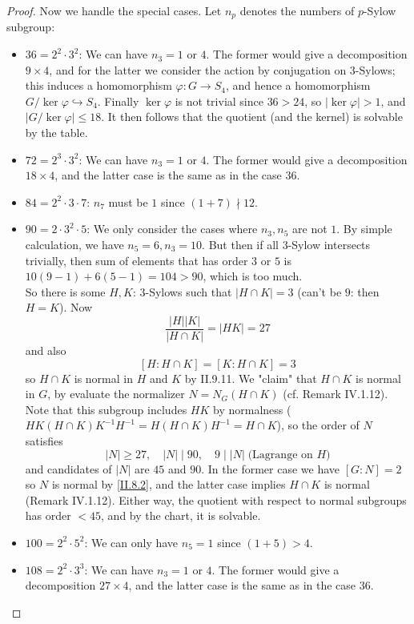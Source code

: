 \begin{proof}
Now we handle the special cases. Let $n_p$ denotes the numbers of $p$-Sylow subgroup:
\begin{itemize}
\setlength\itemsep{0pt}
\item $36 = 2^2 \cdot 3^2$: We can have $n_3 = 1$ or $4$. The former would give a decomposition $9 \times 4$, and for the latter we consider the action by conjugation on $3$-Sylows; this induces a homomorphism $\varphi : G \to S_4$, and hence a homomorphism $G/\ker \varphi \hookrightarrow S_4$. Finally $\ker \varphi$ is not trivial since $36 > 24$, so $|\ker \varphi|>1$, and $|G/\ker \varphi| \leq 18$. It then follows that the quotient (and the kernel) is solvable by the table. 
\item $72 = 2^3 \cdot 3^2$: We can have $n_3 = 1$ or $4$. The former would give a decomposition $18 \times 4$, and the latter case is the same as in the case $36$.
\item $84 = 2^2 \cdot 3 \cdot 7$: $n_7$ must be $1$ since $(1+7) \nmid 12$. 
\item $90 = 2 \cdot 3^2 \cdot 5$: We only consider the cases where $n_3, n_5$ are not $1$. By simple calculation, we have $n_5 = 6, n_3 = 10$. But then if all $3$-Sylow intersects trivially, then sum of elements that has order $3$ or $5$ is $10(9-1)+6(5-1) = 104 > 90$, which is too much. \\
So there is some $H,K$: $3$-Sylows such that $|H \cap K| = 3$ (can't be $9$: then $H = K$). Now
\[
\frac{|H||K|}{|H \cap K|} = |HK| = 27	
\]
and also 
\[
[H:H\cap K] = [K:H\cap K] = 3
\]
so $H\cap K$ is normal in $H$ and $K$ by II.9.11. We "claim" that $H \cap K$ is normal in $G$, by evaluate the normalizer $N = N_G(H \cap K)$ (cf. Remark IV.1.12). Note that this subgroup includes $HK$ by normalness ($HK(H \cap K)K^{-1}H^{-1} = H(H \cap K)H^{-1} = H \cap K$), so the order of $N$ satisfies
\[
|N| \geq 27, \quad |N| \mid 90, \quad 9 \mid |N| \; \text{(Lagrange on }H)
\]
and candidates of $|N|$ are $45$ and $90$. In the former case we have $[G : N] = 2$ so $N$ is normal by \ref{II.8.2}, and the latter case implies $H \cap K$ is normal (Remark IV.1.12). Either way, the quotient with respect to normal subgroups has order $<45$, and by the chart, it is solvable.
\item $100 = 2^2 \cdot 5^2$: We can only have $n_5 = 1$ since $(1+5) > 4$. 
\item $108 = 2^2 \cdot 3^3$: We can have $n_3 = 1$ or $4$. The former would give a decomposition $27 \times 4$, and the latter case is the same as in the case $36$.
\end{itemize}


\end{proof}
